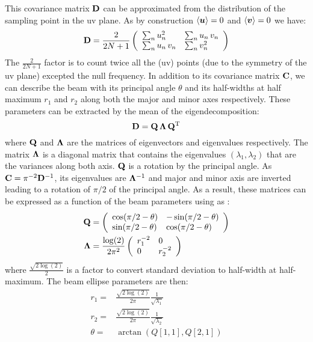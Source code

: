\documentclass[a4paper,11pt,twoside]{scrartcl}
\begin{document}
This covariance matrix $\mathbf{D}$  can be approximated from the distribution of  the sampling point in the uv plane. As by construction $\left\langle \boldsymbol{u}\right\rangle = 0 $ and $\left\langle \boldsymbol{v}\right\rangle = 0$ we have:
\begin{equation}
	\mathbf{D} = \frac{2}{2N+1}\left(
		\begin{array}{ll}
			 \sum_n u_n^2 	 &  \sum_n u_n \,v_n\\
			 \sum_n u_n \,v_n &  \sum_n v_n^2
		\end{array}
	\right)
\end{equation}
The $ \frac{2}{2N+1}$ factor is to  count twice all the (uv) points (due to the  symmetry of the uv plane) excepted the null frequency. 
In addition to its covariance matrix $\mathbf{C}$, we can describe the beam with its principal angle $\theta$ and its half-widths at half maximum  $r_1$  and  $r_2$ along both the major and minor axes respectively.   These parameters can be extracted by the mean of the eigendecomposition:
\begin{equation}
	\mathbf{D} = \mathbf{Q} \, \mathbf{\Lambda} \, \mathbf{Q}^{\mathrm{T}}
\end{equation}
where $\mathbf{Q}$ and $\mathbf{\Lambda}$ are the matrices of eigenvectors and eigenvalues respectively. The matrix $\mathbf{\Lambda}$ is a diagonal matrix that contains the eigenvalues $(\lambda_1,\lambda_2)$ that are the variances along both axis. $\mathbf{Q}$ is a rotation  by the principal angle. As  $\mathbf{C} = \pi^{-2}\mathbf{D}^{-1}$, its eigenvalues are $ \mathbf{\Lambda}^{-1}$ and major and minor axis are inverted leading to a rotation of $\pi/2$ of the principal angle. As a result, these matrices can be expressed as a function of the beam parameters using as :
\begin{align}
	\mathbf{Q} &= \left(
		\begin{array}{ll}
			\cos(\pi/2 - \theta) & -\sin(\pi/2 - \theta) \\
			\sin(\pi/2 - \theta) & \cos(\pi/2 - \theta)  
		\end{array}
		\right)\\
	\mathbf{\Lambda} &=  \frac{\log(2)}{2\pi^2} \left(
		\begin{array}{ll}
		r_1^{-2}	&  0\\
		0 			&  r_2^{-2}
		\end{array}
		\right)
\end{align}
where $\frac{\sqrt{2\log(2)}}{2}$ is a factor to convert standard deviation to half-width at half-maximum.
The beam ellipse parameters are then:
\begin{align}
	r_1 = & \frac{\sqrt{2\log(2)}}{2\pi} \frac{1}{\sqrt{\lambda_1}}\\
	r_2 = & \frac{\sqrt{2\log(2)}}{2\pi}  \frac{1}{\sqrt{\lambda_2}}\\
	\theta = & \arctan\left(Q[1,1], Q[2,1]\right)
\end{align}
\end{document}
